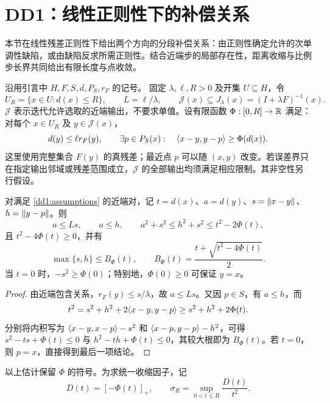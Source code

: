 \section{DD1：线性正则性下的补偿关系}\label{sec:dd1}

本节在线性残差正则性下给出两个方向的分段补偿关系：由正则性确定允许的次单调性缺陷，或由缺陷反求所需正则性。结合近端步的局部存在性，距离收缩与比例步长界共同给出有限长度与点收敛。

沿用引言中 $H,F,S,d,P_S,r_F$ 的记号。
固定 $\lambda,\ell,R>0$ 及开集 $U\subseteq H$，令
\[
 U_R=\{x\in U:d(x)\le R\},\qquad L=\ell/\lambda,\qquad
 \mathcal J(x)\subseteq J_\lambda(x)=(I+\lambda F)^{-1}(x).
\]
$\mathcal J$ 表示迭代允许选取的近端输出，不要求单值。设有限函数 $\Phi:[0,R]\to\mathbb R$ 满足：对每个 $x\in U_R$ 及 $y\in\mathcal J(x)$，
\begin{equation}\label{dd1:assumptions}
 d(y)\le\ell r_F(y),\qquad
 \exists p\in P_S(x):\quad\langle x-y,y-p\rangle\ge\Phi(d(x)).
\end{equation}
这里使用完整集合 $F(y)$ 的真残差；最近点 $p$ 可以随 $(x,y)$ 改变。若误差界只在指定输出邻域或残差范围成立，$\mathcal J$ 的全部输出均须满足相应限制。其非空性另行假设。

\begin{lemma}[一步几何估计]\label{dd1:geometry}
对满足 \eqref{dd1:assumptions} 的近端对，记 $t=d(x)$、$a=d(y)$、$s=\lVert x-y\rVert$、$h=\lVert y-p\rVert$。则
\begin{equation}\label{eq:dd1-energy}
 a\le Ls,\qquad a\le h,\qquad
 a^2+s^2\le h^2+s^2\le t^2-2\Phi(t),
\end{equation}
且 $t^2-4\Phi(t)\ge0$，并有
\begin{equation}\label{eq:dd1-step}
 \max\{s,h\}\le B_\Phi(t),\qquad
 B_\Phi(t)=\frac{t+\sqrt{t^2-4\Phi(t)}}2.
\end{equation}
当 $t=0$ 时，$-s^2\ge\Phi(0)$；特别地，$\Phi(0)\ge0$ 可保证 $y=x$。
\end{lemma}

\begin{proof}
由近端包含关系，$r_F(y)\le s/\lambda$，故 $a\le Ls$。又因 $p\in S$，有 $a\le h$，而
\[
 t^2=s^2+h^2+2\langle x-y,y-p\rangle\ge s^2+h^2+2\Phi(t).
\]
分别将内积写为 $\langle x-y,x-p\rangle-s^2$ 和 $\langle x-p,y-p\rangle-h^2$，可得
$s^2-ts+\Phi(t)\le0$ 与 $h^2-th+\Phi(t)\le0$，其较大根即为 $B_\Phi(t)$。若 $t=0$，则 $p=x$，直接得到最后一项结论。
\end{proof}

以上估计保留 $\Phi$ 的符号。为求统一收缩因子，记
\begin{equation}\label{dd1:negative-part}
 D(t)=[-\Phi(t)]_+,\qquad
 \sigma_R=\sup_{0<t\le R}\frac{D(t)}{t^2}.
\end{equation}

